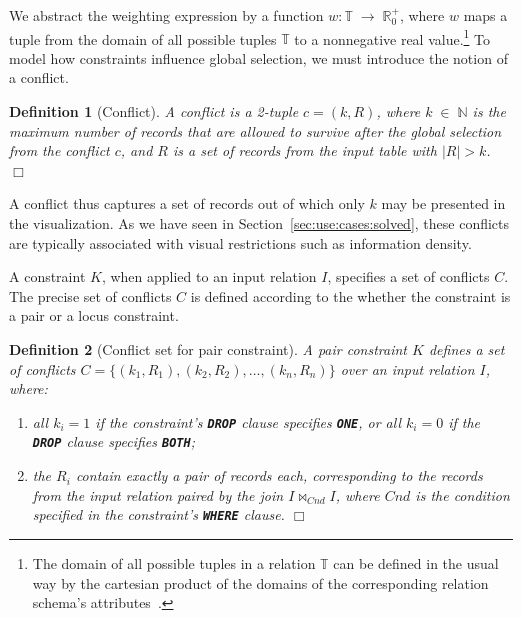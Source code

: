 \documentclass[11pt, oneside]{report}
\newtheorem{definition}{Definition}
\newcommand{\mathendbox}{\hfill$\Box$}
\begin{document}
We abstract the weighting expression by a function $w: \mathbb{T} \; \rightarrow \; \mathbb{R}_{0}^+$, where $w$ maps a tuple from the domain of all possible tuples $\mathbb{T}$ to a nonnegative real value.\footnote{The domain of all possible tuples in a relation $\mathbb{T}$ can be defined in the usual way by the cartesian product of the domains of the corresponding relation schema's attributes~\cite{RG02:CowBook}.} To model how constraints influence global selection, we must introduce the notion of a conflict. 

\begin{definition}[Conflict]
A conflict is a 2-tuple $c = (k, R)$, where $k \; \in \; \mathbb{N}$ is the maximum number of records that are allowed to survive after the global selection from the conflict $c$, and $R$ is a set of records from the input table with $|R| > k$. \mathendbox
\end{definition}
 
A conflict thus captures a set of records out of which only $k$ may be presented in the visualization. As we have seen in Section~\ref{sec:use:cases:solved}, these conflicts are typically associated with visual restrictions such as information density. 
 
A constraint $K$, when applied to an input relation $I$, specifies a set of conflicts $C$. The precise set of conflicts $C$ is defined according to the whether the constraint is a pair or a locus constraint. 

\begin{definition}[Conflict set for pair constraint]
A pair constraint $K$ defines a set of conflicts $C = \{ (k_1, R_1), (k_2, R_2), \ldots, (k_n, R_n) \}$ over an input relation $I$, where:
\begin{enumerate}[label=(\alph*)]
\item all $k_i = 1$ if the constraint's \textbf{\texttt{DROP}} clause specifies \textbf{\texttt{ONE}}, or all $k_i = 0$ if the \textbf{\texttt{DROP}} clause specifies \textbf{\texttt{BOTH}};
\item the $R_i$ contain exactly a pair of records each, corresponding to the records from the input relation paired by the join $I \bowtie_{Cnd} I$, where $Cnd$ is the condition specified in the constraint's \textbf{\texttt{WHERE}} clause. \mathendbox
\end{enumerate}   
\label{def:conflict:set:pair}
\end{definition} 
\end{document}
